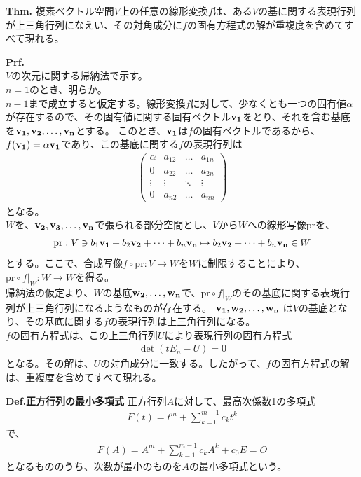 \documentclass[a4paper,11pt]{jsarticle}
\numberwithin{equation}{section}
\begin{document}
\begin{itembox}[l]{\textbf{Thm.}}
  複素ベクトル空間$V$上の任意の線形変換$f$は、ある$V$の基に関する表現行列が上三角行列になえい、その対角成分に$f$の固有方程式の解が重複度を含めてすべて現れる。
\end{itembox}
\textbf{Prf.}\\
$V$の次元に関する帰納法で示す。\\
$n=1$のとき、明らか。\\
$n-1$まで成立すると仮定する。線形変換$f$に対して、少なくとも一つの固有値$\alpha$が存在するので、その固有値に関する固有ベクトル$\vb{v_1}$をとり、それを含む基底を$\vb{v_1}, \vb{v_2,} \dots, \vb{v_n}$とする。
このとき、$\vb{v_1}$は$f$の固有ベクトルであるから、$f(\vb{v_1}) = \alpha\vb{v_1}$であり、この基底に関する$f$の表現行列は
\begin{align}
  \begin{pmatrix}
    \alpha & a_{12} & \dots & a_{1n}\\
    0 & a_{22} & \dots & a_{2n}\\
    \vdots & \vdots & \ddots & \vdots\\
    0 & a_{n2} & \dots & a_{nn}
  \end{pmatrix}
\end{align}
となる。\\
$W$を、$\vb{v_2}, \vb{v_3,} \dots, \vb{v_n}$で張られる部分空間とし、$V$から$W$への線形写像$\text{pr}$を、
\begin{align}
  \text{pr}: V \ni b_1\vb{v_1} + b_2\vb{v_2} + \dots + b_n\vb{v_n} \mapsto b_2\vb{v_2} + \dots + b_n\vb{v_n} \in W
\end{align}
とする。ここで、合成写像$f \circ \text{pr}: V \to W$を$W$に制限することにより、$\text{pr}\circ f |_{W}: W \to W$を得る。\\
帰納法の仮定より、$W$の基底$\vb{w_2},\dots , \vb{w_n}$で、$\text{pr}\circ f |_{W}$のその基底に関する表現行列が上三角行列になるようなものが存在する。
$\vb{v_1}, \vb{w_2}, \dots, \vb{w_{n}}$
は$V$の基底となり、その基底に関する$f$の表現行列は上三角行列になる。\\
$f$の固有方程式は、この上三角行列$U$により表現行列の固有方程式
\begin{align}
  \det(tE_n - U) = 0
\end{align}
となる。その解は、$U$の対角成分に一致する。したがって、$f$の固有方程式の解は、重複度を含めてすべて現れる。\hfill\qedsymbol\\

\begin{itembox}[l]{\textbf{Def.正方行列の最小多項式}}
  正方行列$A$に対して、最高次係数1の多項式
  \begin{align}
    F(t) = t^m + \sum_{k=0}^{m-1} c_kt^k
  \end{align}
  で、
  \begin{align}
    F(A) = A^m + \sum_{k=1}^{m-1} c_kA^k + c_0E = O
  \end{align}
  となるもののうち、次数が最小のものを$A$の最小多項式という。
\end{itembox}
 
\end{document}
